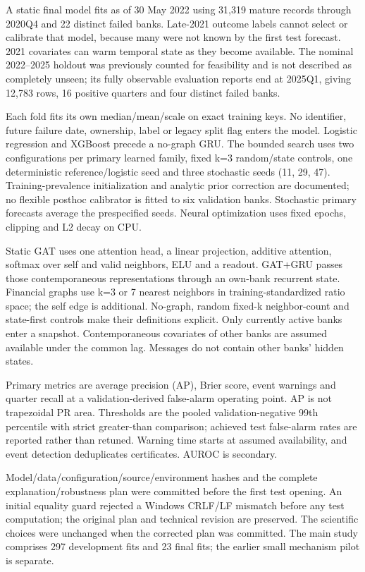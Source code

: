 \documentclass[11pt]{article}
\begin{document}
A static final model fits as of 30 May 2022 using 31,319 mature records through 2020Q4 and 22 distinct failed banks. Late-2021 outcome labels cannot select or calibrate that model, because many were not known by the first test forecast. 2021 covariates can warm temporal state as they become available. The nominal 2022--2025 holdout was previously counted for feasibility and is not described as completely unseen; its fully observable evaluation reports end at 2025Q1, giving 12,783 rows, 16 positive quarters and four distinct failed banks.

Each fold fits its own median/mean/scale on exact training keys. No identifier, future failure date, ownership, label or legacy split flag enters the model. Logistic regression and XGBoost precede a no-graph GRU. The bounded search uses two configurations per primary learned family, fixed k=3 random/state controls, one deterministic reference/logistic seed and three stochastic seeds (11, 29, 47). Training-prevalence initialization and analytic prior correction are documented; no flexible posthoc calibrator is fitted to six validation banks. Stochastic primary forecasts average the prespecified seeds. Neural optimization uses fixed epochs, clipping and L2 decay on CPU.

Static GAT uses one attention head, a linear projection, additive attention, softmax over self and valid neighbors, ELU and a readout. GAT+GRU passes those contemporaneous representations through an own-bank recurrent state. Financial graphs use k=3 or 7 nearest neighbors in training-standardized ratio space; the self edge is additional. No-graph, random fixed-k neighbor-count and state-first controls make their definitions explicit. Only currently active banks enter a snapshot. Contemporaneous covariates of other banks are assumed available under the common lag. Messages do not contain other banks' hidden states.

Primary metrics are average precision (AP), Brier score, event warnings and quarter recall at a validation-derived false-alarm operating point. AP is not trapezoidal PR area. Thresholds are the pooled validation-negative 99th percentile with strict greater-than comparison; achieved test false-alarm rates are reported rather than retuned. Warning time starts at assumed availability, and event detection deduplicates certificates. AUROC is secondary.

Model/data/configuration/source/environment hashes and the complete explanation/robustness plan were committed before the first test opening. An initial equality guard rejected a Windows CRLF/LF mismatch before any test computation; the original plan and technical revision are preserved. The scientific choices were unchanged when the corrected plan was committed. The main study comprises 297 development fits and 23 final fits; the earlier small mechanism pilot is separate.
\end{document}
